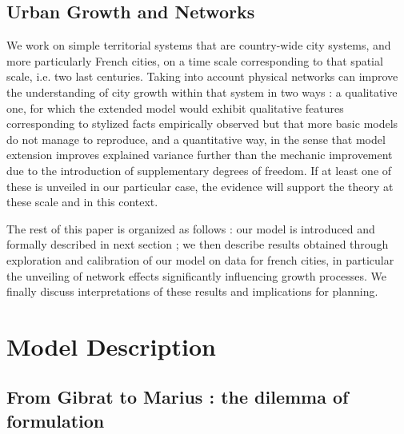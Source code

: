 \documentclass[Royal,sageh,times]{sagej}
\begin{document}


\subsection*{Urban Growth and Networks}







We work on simple territorial systems that are country-wide city systems, and more particularly French cities, on a time scale corresponding to that spatial scale, i.e. two last centuries. Taking into account physical networks can improve the understanding of city growth within that system in two ways : a qualitative one, for which the extended model would exhibit qualitative features corresponding to stylized facts empirically observed but that more basic models do not manage to reproduce, and a quantitative way, in the sense that model extension improves explained variance further than the mechanic improvement due to the introduction of supplementary degrees of freedom. If at least one of these is unveiled in our particular case, the evidence will support the theory at these scale and in this context.



The rest of this paper is organized as follows : our model is introduced and formally described in next section ; we then describe results obtained through exploration and calibration of our model on data for french cities, in particular the unveiling of network effects significantly influencing growth processes. We finally discuss interpretations of these results and implications for planning.





\section*{Model Description}




\subsection*{From Gibrat to Marius : the dilemma of formulation}
\end{document}
